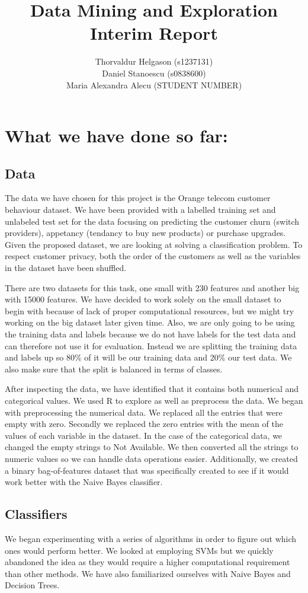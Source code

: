 \documentclass[a4paper,11pt]{article}
\title{Data Mining and Exploration\\Interim Report}
\author{Thorvaldur Helgason (s1237131) \\
Daniel Stanoescu (s0838600) \\
Maria Alexandra Alecu (STUDENT NUMBER)}
\begin{document}
    
\maketitle



\section*{What we have done so far:}
\subsection*{Data}
The data we have chosen for this project is the Orange telecom customer behaviour dataset. We have been provided with a labelled training set and unlabeled test set for the data focusing on predicting the customer churn (switch providers), appetancy (tendancy to buy new products) or purchase upgrades. Given the proposed dataset, we are looking at solving a classification problem.  To respect customer privacy, both the order of the customers as well as the variables in the dataset have been shuffled.

There are two datasets for this task, one small with 230 features and another big with 15000 features. We have decided to work solely on the small dataset to begin with because of lack of proper computational resources, but we might try working on the big dataset later given time. Also, we are only going to be using the training data and labels because we do not have labels for the test data and can therefore not use it for evaluation. Instead we are splitting the training data and labels up so 80\% of it will be our training data and 20\% our test data. We also make sure that the split is balanced in terms of classes.

After inspecting the data, we have identified that it contains both numerical and categorical values. We used R to explore as well as preprocess the data. We began with preprocessing the numerical data. We replaced all the entries that were empty with zero. Secondly we replaced the zero entries with the mean of the values of each variable in the dataset. In the case of the categorical data, we changed the empty strings to Not Available. We then converted all the strings to numeric values so we can handle data operations easier. Additionally, we created a binary bag-of-features dataset that was specifically created to see if it would work better with the Naive Bayes classifier. 


\subsection*{Classifiers}
We began experimenting with a series of algorithms in order to figure out which ones would perform better. We looked at employing SVMs but we quickly abandoned the idea as they would require a higher computational requirement than other methods. We have also familiarized ourselves with Naive Bayes and Decision Trees.
\end{document}
